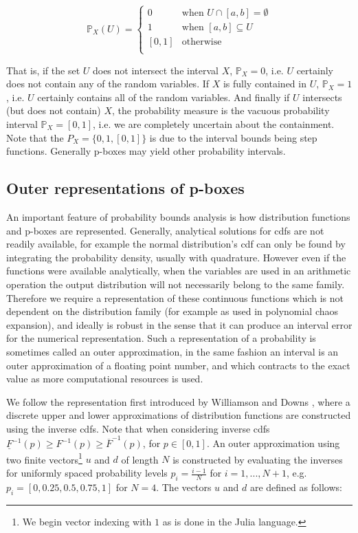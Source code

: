 \documentclass{juliacon}
\begin{document}
\begin{equation*}
  \mathbb{P}_{X}(U) = \begin{cases}
    0 & \text{when } U \cap [a,b] = \emptyset \\
    1 & \text{when } [a,b] \subseteq U  \\
    [0, 1] & \text{otherwise }\\
  \end{cases}
\end{equation*}

\noindent That is, if the set $U$ does not intersect the interval $X$, $\mathbb{P}_{X}=0$, i.e. $U$ certainly does not contain any of the random variables. If $X$ is fully contained in $U$, $\mathbb{P}_{X}=1$, i.e. $U$ certainly contains all of the random variables. And finally if $U$ intersects (but does not contain) $X$, the probability measure is the vacuous probability interval $\mathbb{P}_{X} = [0, 1]$, i.e. we are completely uncertain about the containment. Note that the $P_{X} = \{0, 1, [0,1]\}$ is due to the interval bounds being step functions. Generally p-boxes may yield other probability intervals.

\subsection{Outer representations of p-boxes}
\label{sec:outer_approx}

An important feature of probability bounds analysis is how distribution functions and p-boxes are represented. Generally, analytical solutions for cdfs are not readily available, for example the normal distribution's cdf can only be found by integrating the probability density, usually with quadrature. However even if the functions were available analytically, when the variables are used in an arithmetic operation the output distribution will not necessarily belong to the same family. Therefore we require a representation of these continuous functions which is not dependent on the distribution family (for example as used in polynomial chaos expansion), and ideally is robust in the sense that it can produce an interval error for the numerical representation. Such a representation of a probability is sometimes called an outer approximation, in the same fashion an interval is an outer approximation of a floating point number, and which contracts to the exact value as more computational resources is used.

We follow the representation first introduced by Williamson and Downs \cite{williamson1990probabilistic}, where a discrete upper and lower approximations of distribution functions are constructed using the inverse cdfs. Note that when considering inverse cdfs $\underline{F}^{-1}(p) \geq F^{-1}(p) \geq \overline{F}^{-1}(p)$, for $p \in [0,1]$. An outer approximation using two finite vectors\footnote{We begin vector indexing with $1$ as is done in the Julia language.} $u$ and $d$ of length $N$ is constructed by evaluating the inverses for uniformly spaced probability levels $p_{i} = \frac{i-1}{N}$ for $i = 1, ... , N+1$, e.g. $p_{i} = [0, 0.25, 0.5, 0.75, 1]$ for $N = 4$. The vectors $u$ and $d$ are defined as follows:
\end{document}
